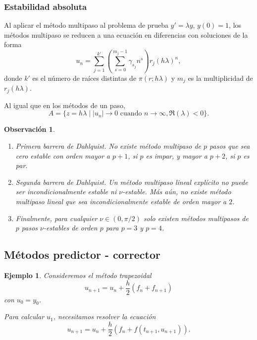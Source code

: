 \documentclass[11pt,letterpaper]{report}
\newtheorem{example}{Ejemplo}
\newtheorem{remark}{Observación}
\begin{document}
\subsubsection{Estabilidad absoluta}
Al aplicar el método multipaso al problema de prueba $y'=\lambda y$,
$y(0)=1$, los métodos multipaso se reducen a una ecuación en
diferencias con soluciones de la forma
\begin{equation}
  u_n = \sum_{j=1}^{k'}
  \left(
    \sum_{s=0}^{m_j-1} \gamma_{s_j} n^{s}
  \right)
  r_{j}(h\lambda)^n
,\end{equation}
donde $k'$ es el número de raíces distintas de $\pi(r;h\lambda)$ y
$m_j$ es la multiplicidad de $r_j(h\lambda)$.

Al igual que en los métodos de un paso,
\begin{equation}
  A 
  = \{
    z=h\lambda
  \mid
  |u_n|\to 0 \text{ cuando } n\to \infty,
  \Re(\lambda)<0
\}
.\end{equation}

\begin{remark}
  \begin{enumerate}
    \item
      Primera barrera de Dahlquist.
      No existe método multipaso de $p$ pasos que sea cero estable con
      orden mayor a $p+1$, si $p$ es impar, y mayor a $p+2$, si $p$ es
      par.
    \item
      Segunda barrera de Dahlquist. Un método multipaso lineal
      explícito no puede ser incondicionalmente estable ni
      $\nu$-estable. Más aún, no existe método multipaso lineal que
      sea incondicionalmente estable de orden mayor a $2$.
    \item
      Finalmente, para cualquier $\nu\in(0,\pi / 2)$ solo existen
      métodos multipasos de $p$ pasos $\nu$-estables de orden $p$ para
      $p=3$ y $p=4$.
  \end{enumerate}
\end{remark}

\subsection{Métodos predictor - corrector}

\begin{example}
  Consideremos el método trapezoidal
  \begin{equation}
    u_{n+1} = u_n + \frac{h}{2}(f_n + f_{n+1})
  \end{equation}
  con $u_0=y_0$.

  Para calcular $u_1$, necesitamos resolver la ecuación
  \begin{equation}
    u_{n+1} = u_n + \frac{h}{2}(f_n + f(t_{n+1},u_{n+1})).
  \end{equation}
\end{example}
\end{document}
